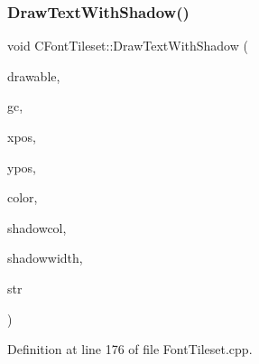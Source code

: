 \subsubsection{\texorpdfstring{Draw\+Text\+With\+Shadow()}{DrawTextWithShadow()}}
{\footnotesize\ttfamily void C\+Font\+Tileset\+::\+Draw\+Text\+With\+Shadow (\begin{DoxyParamCaption}\item[{Gdk\+Drawable $\ast$}]{drawable,  }\item[{Gdk\+GC $\ast$}]{gc,  }\item[{gint}]{xpos,  }\item[{gint}]{ypos,  }\item[{int}]{color,  }\item[{int}]{shadowcol,  }\item[{int}]{shadowwidth,  }\item[{const std\+::string \&}]{str }\end{DoxyParamCaption})}



Definition at line 176 of file Font\+Tileset.\+cpp.


